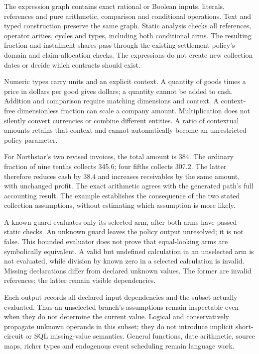 The expression graph contains exact rational or Boolean inputs, literals,
references and pure arithmetic, comparison and conditional operations. Text
and typed construction preserve the same graph. Static analysis checks all
references, operator arities, cycles and types, including both conditional
arms. The resulting fraction and instalment shares pass through the existing
settlement policy's domain and claim-allocation checks. The expressions do
not create new collection dates or decide which contracts should exist.

Numeric types carry units and an explicit context. A quantity of goods times
a price in dollars per good gives dollars; a quantity cannot be added to cash.
Addition and comparison require matching dimensions and context. A
context-free dimensionless fraction can scale a company amount. Multiplication
does not silently convert currencies or combine different entities. A ratio
of contextual amounts retains that context and cannot automatically become
an unrestricted policy parameter.

For Northstar's two revised invoices, the total amount is 384. The ordinary
fraction of nine tenths collects 345.6; four fifths collects 307.2. The latter
therefore reduces cash by 38.4 and increases receivables by the same amount,
with unchanged profit. The exact arithmetic agrees with the generated path's
full accounting result. The example establishes the consequence of the two
stated collection assumptions, without estimating which assumption is more
likely.

A known guard evaluates only its selected arm, after both arms have passed
static checks. An unknown guard leaves the policy output unresolved; it is
not false. This bounded evaluator does not prove that equal-looking arms are
symbolically equivalent. A valid but undefined calculation in an unselected
arm is not evaluated, while division by known zero in a selected calculation
is invalid. Missing declarations differ from declared unknown values. The
former are invalid references; the latter remain visible dependencies.

Each output records all declared input dependencies and the subset actually
evaluated. Thus an unselected branch's assumptions remain inspectable even
when they do not determine the current value. Logical  and
 conservatively propagate unknown operands in this subset; they do
not introduce implicit short-circuit or SQL missing-value semantics. General
functions, date arithmetic, source maps, richer types and endogenous event
scheduling remain language work.


